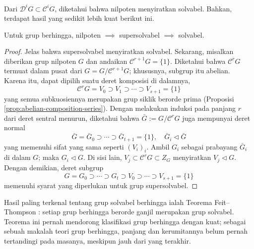 Dari $\mathscr{D}^i G \subset \mathscr{C}^i G$, diketahui bahwa nilpoten menyiratkan solvabel. Bahkan, terdapat hasil yang sedikit lebih kuat berikut ini.
\begin{lemma}
	Untuk grup berhingga, nilpoten $\implies$ supersolvabel $\implies$ solvabel.
\end{lemma}
\begin{proof}
	Jelas bahwa supersolvabel menyiratkan solvabel. Sekarang, misalkan diberikan grup nilpoten $G$ dan andaikan $\mathscr{C}^{r+1}G = \{1\}$. Diketahui bahwa $\mathscr{C}^r G$ termuat dalam pusat dari $G = G/\mathscr{C}^{r+1} G$; khususnya, subgrup itu abelian. Karena itu, dapat dipilih suatu deret komposisi di dalamnya,
	\[ \mathscr{C}^r G = V_0 \supset V_1 \supset \cdots \supset V_{s+1} = \{1\} \]
	yang semua subkuosiennya merupakan grup siklik berorde prima (Proposisi \ref{prop:abelian-composition-series}). Dengan melakukan induksi pada panjang $r$ dari deret sentral menurun, diketahui bahwa $\bar{G} := G/\mathscr{C}^r G$ juga mempunyai deret normal
	\[ \bar{G} = \bar{G}_0  \supset \cdots \supset \bar{G}_{t+1} = \{1\}, \quad \bar{G}_i \lhd \bar{G} \]
	yang memenuhi sifat yang sama seperti $(V_i)_i$. Ambil $G_i$ sebagai prabayang $\bar{G}_i$ di dalam $G$; maka $G_i \lhd G$. Di sisi lain, $V_j \subset \mathscr{C}^r G \subset Z_G$ menyiratkan $V_j \lhd G$. Dengan demikian, deret subgrup
	\[ G = G_0 \supset \cdots \supset G_t \supset V_0 \supset \cdots \supset V_{s+1} = \{1\} \]
	memenuhi syarat yang diperlukan untuk grup supersolvabel.
\end{proof}

Hasil paling terkenal tentang grup solvabel berhingga ialah Teorema Feit--Thompson \cite{FT63}: setiap grup berhingga berorde ganjil merupakan grup solvabel. Teorema ini pernah mendorong klasifikasi grup berhingga dengan kuat; sebagai sebuah makalah teori grup berhingga, panjang dan kerumitannya belum pernah tertandingi pada masanya, meskipun jauh dari yang terakhir.


